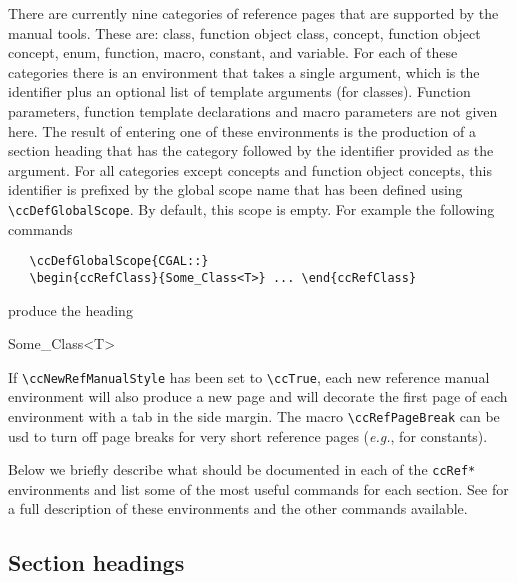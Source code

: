 There are currently nine categories of reference pages that are supported by 
the manual tools.  These are: class, function object class, concept, 
function object concept, enum, function, macro, constant, and 
variable.  For each of these categories there is an environment that takes
a single argument, which is the identifier plus an optional list of 
template arguments (for classes).  Function parameters, function template
declarations and macro parameters are not given here.  The result of entering
one of these environments is the production of a section heading that
has the category followed by the identifier provided as the argument.  
For all categories except concepts and function object concepts, this 
identifier is prefixed by the
global scope name that has been defined using \verb|\ccDefGlobalScope|.
By default, this scope is empty.  For example the following commands
\begin{verbatim}
   \ccDefGlobalScope{CGAL::}
   \begin{ccRefClass}{Some_Class<T>} ... \end{ccRefClass}
\end{verbatim}

produce the heading

\ccAutoIndexingOff
\ccHtmlNoClassToc
\ccHtmlNoIndex
\begin{ccRefClass}{Some_Class<T>} \end{ccRefClass}
\ccAutoIndexingOn

If \verb|\ccNewRefManualStyle|%
 has been set to \verb|\ccTrue|, each
new reference manual environment will also produce a new page and will
decorate the first page of each environment with a tab in the side
margin.   The macro \verb|\ccRefPageBreak| can be usd to turn off page
breaks for very short reference pages (\textit{e.g.},  for constants).

Below we briefly describe what should be documented in
each of the {\tt ccRef*} environments and list some of the most useful
commands for each section.  See 
for a full description of these environments and the other commands
available.

\subsection{Section headings}
\label{sec:section_headings}

